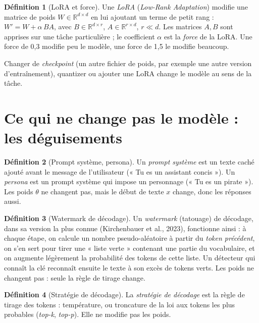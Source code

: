 \documentclass[11pt,a4paper]{report}
\theoremstyle{definition}
\newtheorem{definition}{Définition}[chapter]
\theoremstyle{plain}
\begin{document}
\begin{definition}[LoRA et force]
Une \emph{LoRA} (\emph{Low-Rank Adaptation}) modifie une matrice de poids $W\in\mathbb R^{d\times d}$ en lui ajoutant un terme de petit rang : $W' = W + \alpha\, BA$, avec $B\in\mathbb R^{d\times r}$, $A\in\mathbb R^{r\times d}$, $r \ll d$. Les matrices $A,B$ sont apprises sur une tâche particulière ; le coefficient $\alpha$ est la \emph{force} de la LoRA. Une force de 0,3 modifie peu le modèle, une force de 1,5 le modifie beaucoup.
\end{definition}

Changer de \emph{checkpoint} (un autre fichier de poids, par exemple une autre version d'entraînement), quantizer ou ajouter une LoRA change le modèle au sens de la tâche.

\section{Ce qui ne change pas le modèle : les déguisements}

\begin{definition}[Prompt système, persona]
Un \emph{prompt système} est un texte caché ajouté avant le message de l'utilisateur (« Tu es un assistant concis »). Un \emph{persona} est un prompt système qui impose un personnage (« Tu es un pirate »). Les poids $\theta$ ne changent pas, mais le début de texte $x$ change, donc les réponses aussi.
\end{definition}

\begin{definition}[Watermark de décodage]
Un \emph{watermark} (tatouage) de décodage, dans sa version la plus connue (Kirchenbauer et al., 2023), fonctionne ainsi : à chaque étape, on calcule un nombre pseudo-aléatoire à partir du \emph{token précédent}, on s'en sert pour tirer une « liste verte » contenant une partie du vocabulaire, et on augmente légèrement la probabilité des tokens de cette liste. Un détecteur qui connaît la clé reconnaît ensuite le texte à son excès de tokens verts. Les poids ne changent pas : seule la règle de tirage change.
\end{definition}

\begin{definition}[Stratégie de décodage]
La \emph{stratégie de décodage} est la règle de tirage des tokens : température, ou troncature de la loi aux tokens les plus probables (\emph{top-k}, \emph{top-p}). Elle ne modifie pas les poids.
\end{definition}
\end{document}
